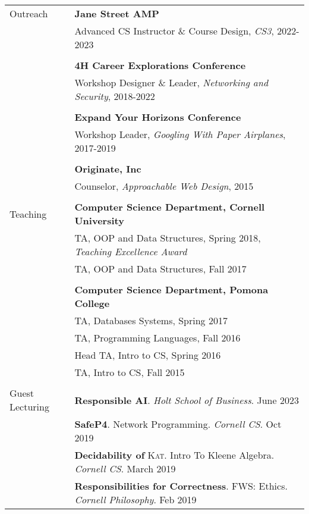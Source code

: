 \documentclass[letterpaper,10pt,oneside]{article}
\begin{document}
\begin{tabular}{@{} l l }
  \Large{Outreach}
  & \textbf{Jane Street AMP} \\
  & Advanced CS Instructor \& Course Design, \emph{CS3}, 2022-2023 \\
  \\

  & \textbf{4H Career Explorations Conference} \\
  & Workshop Designer \& Leader, \emph{Networking and Security}, 2018-2022 \\
  & \\
  & \textbf{Expand Your Horizons Conference} \\
  & Workshop Leader, \emph{Googling With Paper Airplanes}, 2017-2019 \\
  & \\
  & \textbf{Originate, Inc} \\
  & Counselor, \emph{Approachable Web Design}, 2015 \\
  & \\

  \Large{Teaching}
  & \textbf{Computer Science Department, Cornell University} \\
  
  & TA, OOP and Data Structures, Spring 2018, \textit{Teaching Excellence Award} \\
  & TA, OOP and Data Structures, Fall 2017 \\
  &\\
  
  & \textbf{Computer Science Department, Pomona College} \\
  & TA, Databases Systems, Spring 2017 \\
  & TA, Programming Languages, Fall 2016 \\
  & Head TA, Intro to CS, Spring 2016 \\
  & TA, Intro to CS, Fall 2015 \\
  &\\

  \Large{Guest Lecturing} 
  & \textbf{Responsible AI}. \textit{Holt School of Business}. June 2023\\
  & \textbf{SafeP4}. Network Programming. \textit{Cornell CS}. Oct 2019 \\
  & \textbf{Decidability of }\textsc{Kat}. Intro To Kleene Algebra. \textit{Cornell CS}. March 2019 \\
  & \textbf{Responsibilities for Correctness}. FWS: Ethics. \textit{Cornell Philosophy}. Feb 2019\\

\end{tabular}
\end{document}
